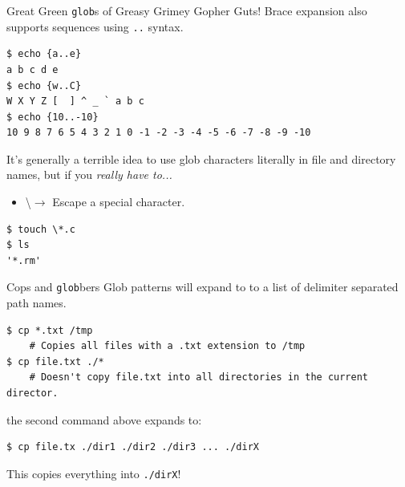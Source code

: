 \documentclass[11pt]{beamer}
\begin{document}
\begin{frame}[fragile=singleslide]{Great Green \texttt{glob}s of Greasy Grimey Gopher Guts!}
Brace expansion also supports sequences using \texttt{..} syntax.
\begin{lstlisting}[style=terminal]
$ echo {a..e}
a b c d e
$ echo {w..C}
W X Y Z [  ] ^ _ ` a b c
$ echo {10..-10}
10 9 8 7 6 5 4 3 2 1 0 -1 -2 -3 -4 -5 -6 -7 -8 -9 -10
\end{lstlisting}

It's generally a terrible idea to use glob characters literally in file and directory names, but if you \emph{really have to...}
\begin{itemize}
\item \textbackslash $\rightarrow$ Escape a special character.  
\end{itemize}
\begin{lstlisting}[style=terminal]
$ touch \*.c 
$ ls 
'*.rm'
\end{lstlisting}
\end{frame}

\begin{frame}[fragile=singleslide]{Cops and \texttt{glob}bers}
Glob patterns will expand to to a list of delimiter separated path names.
\begin{lstlisting}[style=terminal]
$ cp *.txt /tmp
	# Copies all files with a .txt extension to /tmp
$ cp file.txt ./*
	# Doesn't copy file.txt into all directories in the current director.
\end{lstlisting}
the second command above expands to:
\begin{lstlisting}[style=terminal]
$ cp file.tx ./dir1 ./dir2 ./dir3 ... ./dirX
\end{lstlisting}
This copies everything into \texttt{./dirX}!  
\end{frame}
\end{document}
